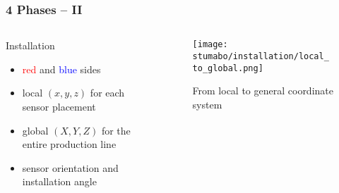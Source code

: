 \begin{frame}
    \frametitle{4 Phases -- II}
    \vspace*{\fill}
    \begin{columns}[onlytextwidth, c]
        \begin{column}{.47\textwidth}
            \begin{exampleblock}{Installation}
                \begin{itemize}
                    \item \textcolor{red}{red} and \textcolor{blue}{blue} sides
                    \item local $(x,y,z)$ for each sensor placement
                    \item global $(X,Y,Z)$ for the entire production line
                    \item sensor orientation and installation angle
                \end{itemize}
            \end{exampleblock}
        \end{column}
        \begin{column}{.52\textwidth}
            \begin{figure}
                \texttt{[image: stumabo/installation/local\_to\_global.png]}
                \caption{From local to general coordinate system}
            \end{figure}
        \end{column}
    \end{columns}
    \vspace*{\fill}
\end{frame}

